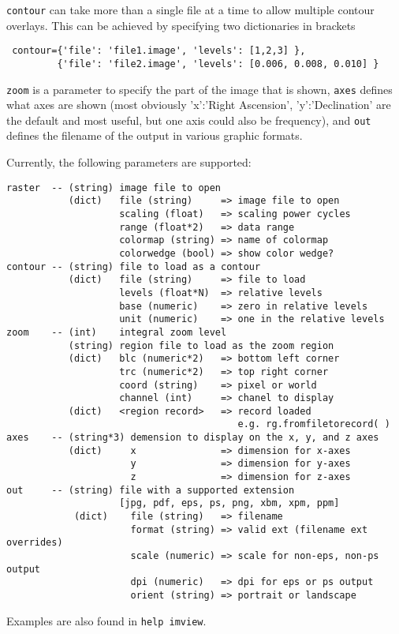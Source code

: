 {\tt contour} can take more than a single file at a time to allow
multiple contour overlays. This can be achieved by specifying two
dictionaries in {} brackets

\small
\begin{verbatim}
 contour={'file': 'file1.image', 'levels': [1,2,3] },
         {'file': 'file2.image', 'levels': [0.006, 0.008, 0.010] }
\end{verbatim}
\normalsize


{\tt zoom} is a parameter to specify the part of the image that is
shown, {\tt axes} defines what axes are shown (most obviously 'x':'Right
Ascension', 'y':'Declination' are the default and most useful, but one
axis could also be frequency), and {\tt out} defines the filename of
the output in various graphic formats. 

Currently, the following parameters are supported:


\small
\begin{verbatim}
raster  -- (string) image file to open
           (dict)   file (string)     => image file to open
                    scaling (float)   => scaling power cycles
                    range (float*2)   => data range
                    colormap (string) => name of colormap
                    colorwedge (bool) => show color wedge?
contour -- (string) file to load as a contour
           (dict)   file (string)     => file to load
                    levels (float*N)  => relative levels
                    base (numeric)    => zero in relative levels
                    unit (numeric)    => one in the relative levels
zoom    -- (int)    integral zoom level
           (string) region file to load as the zoom region
           (dict)   blc (numeric*2)   => bottom left corner
                    trc (numeric*2)   => top right corner
                    coord (string)    => pixel or world
                    channel (int)     => chanel to display
           (dict)   <region record>   => record loaded
                                         e.g. rg.fromfiletorecord( )
axes    -- (string*3) demension to display on the x, y, and z axes
           (dict)     x               => dimension for x-axes
                      y               => dimension for y-axes
                      z               => dimension for z-axes
out     -- (string) file with a supported extension
                    [jpg, pdf, eps, ps, png, xbm, xpm, ppm]
            (dict)    file (string)   => filename
                      format (string) => valid ext (filename ext overrides)
                      scale (numeric) => scale for non-eps, non-ps output
                      dpi (numeric)   => dpi for eps or ps output
                      orient (string) => portrait or landscape
\end{verbatim}
\normalsize
Examples are also found in {\tt help imview}.

